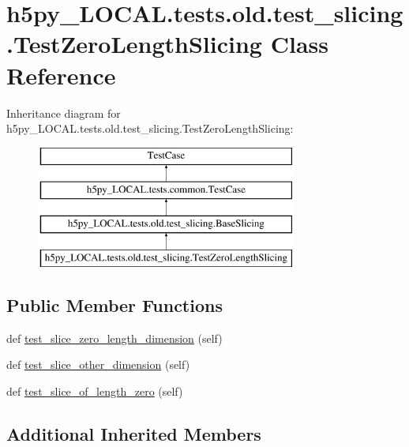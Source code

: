\hypertarget{classh5py__LOCAL_1_1tests_1_1old_1_1test__slicing_1_1TestZeroLengthSlicing}{}\section{h5py\+\_\+\+L\+O\+C\+A\+L.\+tests.\+old.\+test\+\_\+slicing.\+Test\+Zero\+Length\+Slicing Class Reference}
\label{classh5py__LOCAL_1_1tests_1_1old_1_1test__slicing_1_1TestZeroLengthSlicing}
Inheritance diagram for h5py\+\_\+\+L\+O\+C\+A\+L.\+tests.\+old.\+test\+\_\+slicing.\+Test\+Zero\+Length\+Slicing\+:\begin{figure}[H]
\begin{center}
\leavevmode
\includegraphics[height=4.000000cm]{classh5py__LOCAL_1_1tests_1_1old_1_1test__slicing_1_1TestZeroLengthSlicing}
\end{center}
\end{figure}
\subsection*{Public Member Functions}
\begin{DoxyCompactItemize}
\item 
def \hyperlink{classh5py__LOCAL_1_1tests_1_1old_1_1test__slicing_1_1TestZeroLengthSlicing_a764c08d9b185f407615b42f456a3422a}{test\+\_\+slice\+\_\+zero\+\_\+length\+\_\+dimension} (self)
\item 
def \hyperlink{classh5py__LOCAL_1_1tests_1_1old_1_1test__slicing_1_1TestZeroLengthSlicing_a09a8f92276644689dc398ec608dbc5ed}{test\+\_\+slice\+\_\+other\+\_\+dimension} (self)
\item 
def \hyperlink{classh5py__LOCAL_1_1tests_1_1old_1_1test__slicing_1_1TestZeroLengthSlicing_a5ef80599863c59a52902ead813ffa50c}{test\+\_\+slice\+\_\+of\+\_\+length\+\_\+zero} (self)
\end{DoxyCompactItemize}
\subsection*{Additional Inherited Members}


